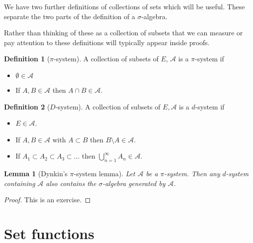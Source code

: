 \documentclass[
]{book}
\providecommand{\tightlist}{%
  \setlength{\itemsep}{0pt}\setlength{\parskip}{0pt}}
\newtheorem{lemma}{Lemma}[chapter]
\theoremstyle{definition}
\newtheorem{definition}{Definition}[chapter]
\theoremstyle{definition}
\theoremstyle{definition}
\theoremstyle{definition}
\theoremstyle{remark}
\begin{document}
We have two further definitions of collections of sets which will be useful. These separate the two parts of the definition of a \(\sigma\)-algebra.

Rather than thinking of these as a collection of subsets that we can measure or pay attention to these definitions will typically appear inside proofs.

\begin{definition}[$\pi$-system]

A collection of subsets of \(E\), \(\mathcal{A}\) is a \(\pi\)-system if

\begin{itemize}
\tightlist
\item
  \(\emptyset \in \mathcal{A}\)
\item
  If \(A, B \in \mathcal{A}\) then \(A \cap B \in \mathcal{A}\).
\end{itemize}

\end{definition}

\begin{definition}[$D$-system]

A collection of subsets of \(E, \mathcal{A}\) is a \(d\)-system if

\begin{itemize}
\tightlist
\item
  \(E \in \mathcal{A}\).
\item
  If \(A, B \in \mathcal{A}\) with \(A \subset B\) then \(B \setminus A \in \mathcal{A}\).
\item
  If \(A_1 \subset A_2 \subset A_3 \subset \dots\) then \(\bigcup_{n=1}^\infty A_n \in \mathcal{A}\).
\end{itemize}

\end{definition}

\begin{lemma}[Dynkin's $\pi$-system lemma]
Let \(\mathcal{A}\) be a \(\pi\)-system. Then any \(d\)-system containing \(\mathcal{A}\) also contains the \(\sigma\)-algebra generated by \(\mathcal{A}\).
\end{lemma}

\begin{proof}
This is an exercise.
\end{proof}

\hypertarget{set-functions}{%
\section{Set functions}\label{set-functions}}
\end{document}
